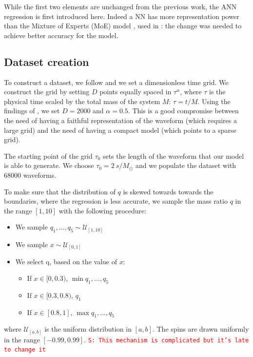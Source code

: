 \documentclass[twocolumn,showpacs,preprintnumbers,nofootinbib,prd,
superscriptaddress,10pt]{revtex4-1}
\newcommand{\stefano}[1]{{\textcolor{red}{\texttt{S: #1}} }}
\begin{document}
While the first two elements are unchanged from the previous work, the ANN regression is first introduced here. Indeed a NN has more representation power than the Mixture of Experts (MoE) model \cite{Jacobs1991AdaptiveMoE}, used in \cite{Schmidt:2020yuu}: the change was needed to achieve better accuracy for the model.

\subsection{Dataset creation}
\label{sec:dataset}

To construct a dataset, we follow \cite{Schmidt:2020yuu} and we set a dimensionless time grid. We construct the grid by setting $D$ points equally spaced in $\tau^\alpha$, where $\tau$ is the physical time scaled by the total mass of the system $M$: $\tau = t/M$. Using the findings of \cite{Schmidt:2020yuu}, we set $D = \text{2000}$ and $\alpha = \text{0.5}$.
%
This is a good compromise between the need of having a faithful representation of the waveform (which requires a large grid) and the need of having a compact model (which points to a sparse grid).

The starting point of the grid $\tau_0$ sets the length of the waveform that our model is able to generate. We choose $\tau_0 = \SI{2}{s/M_\odot}$ and we populate the dataset with $68000$ waveforms.

To make sure that the distribution of $q$ is skewed towards towards the boundaries, where the regression is less accurate, we sample the mass ratio $q$ in the range $[1,10]$ with the following procedure:
\begin{itemize}
	\item We sample $q_1, \hdots, q_5 \sim \mathcal{U}_{[1,10]}$
	\item We sample $x \sim \mathcal{U}_{[0,1]}$
	\item We select q, based on the value of $x$:
	\begin{itemize}
		\item If $x \in [0,0.3)$, $\min q_1, \hdots, q_5$
		\item If $x \in [0.3, 0.8)$, $q_1$
		\item If $x \in [0.8, 1]$, $\max q_1, \hdots, q_5$
	\end{itemize}
\end{itemize}
where $\mathcal{U}_{[a,b]}$ is the uniform distribution in $[a,b]$.
The spins are drawn uniformly in the range $[-0.99, 0.99]$.
\stefano{This mechanism is complicated but it's late to change it}
\end{document}
